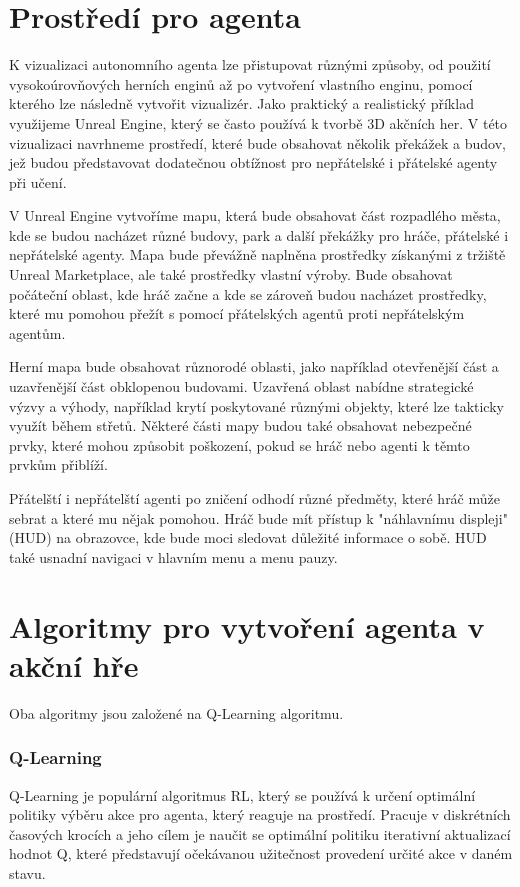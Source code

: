 \section{Prostředí pro agenta}
K vizualizaci autonomního agenta lze přistupovat různými způsoby, od použití vysokoúrovňových herních enginů až po vytvoření vlastního enginu, pomocí kterého lze následně vytvořit vizualizér. Jako praktický a realistický příklad využijeme Unreal Engine, který se často používá k tvorbě 3D akčních her. V této vizualizaci navrhneme prostředí, které bude obsahovat několik překážek a budov, jež budou představovat dodatečnou obtížnost pro nepřátelské i přátelské agenty při učení.

V Unreal Engine vytvoříme mapu, která bude obsahovat část rozpadlého města, kde se budou nacházet různé budovy, park a další překážky pro hráče, přátelské i nepřátelské agenty. Mapa bude převážně naplněna prostředky získanými z tržiště Unreal Marketplace, ale také prostředky vlastní výroby. Bude obsahovat počáteční oblast, kde hráč začne a kde se zároveň budou nacházet prostředky, které mu pomohou přežít s pomocí přátelských agentů proti nepřátelským agentům.

Herní mapa bude obsahovat různorodé oblasti, jako například otevřenější část a uzavřenější část obklopenou budovami. Uzavřená oblast nabídne strategické výzvy a výhody, například krytí poskytované různými objekty, které lze takticky využít během střetů. Některé části mapy budou také obsahovat nebezpečné prvky, které mohou způsobit poškození, pokud se hráč nebo agenti k těmto prvkům přiblíží.

Přátelští i nepřátelští agenti po zničení odhodí různé předměty, které hráč může sebrat a které mu nějak pomohou. Hráč bude mít přístup k "náhlavnímu displeji" (HUD) na obrazovce, kde bude moci sledovat důležité informace o sobě. HUD také usnadní navigaci v hlavním menu a menu pauzy.

\newpage

\section{Algoritmy pro vytvoření agenta v akční hře}
Oba algoritmy jsou založené na Q-Learning algoritmu.
\subsubsection{Q-Learning}
Q-Learning\cite{Watkins1992} je populární algoritmus RL, který se používá k určení optimální politiky výběru akce pro agenta, který reaguje na prostředí. Pracuje v diskrétních časových krocích a jeho cílem je naučit se optimální politiku iterativní aktualizací hodnot Q, které představují očekávanou užitečnost provedení určité akce v daném stavu.


